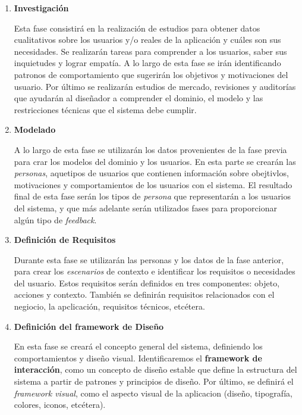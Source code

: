 \begin{enumerate}

\item \textbf{Investigación}

Esta fase consistirá en la realización de estudios para obtener datos cualitativos sobre los usuarios y/o reales de la aplicación y cuáles son sus necesidades. Se realizarán tareas para comprender a los usuarios, saber sus inquietudes y lograr empatía. A lo largo de esta fase se irán identificando patronos de comportamiento que sugerirán los objetivos y motivaciones del usuario. Por último se realizarán estudios de mercado, revisiones y auditorías que ayudarán al diseñador a comprender el dominio, el modelo y las restricciones técnicas que el sistema debe cumplir.

\item \textbf{Modelado}

A lo largo de esta fase se utilizarán los datos provenientes de la fase previa para crar los modelos del dominio y los usuarios. En esta parte se crearán las \textit{personas}, aquetipos de usuarios que contienen información sobre obejtivlos, motivaciones y comportamientos de los usuarios con el sistema. El resultado final de esta fase serán los tipos de \textit{persona} que representarán a los usuarios del sistema, y que más adelante serán utilizados fases para proporcionar algún tipo de \textit{feedback}.

\item \textbf{Definición de Requisitos}

Durante esta fase se utilizarán las personas y los datos de la fase anterior, para crear los \textit{escenarios} de contexto e identificar los requisitos o necesidades del usuario. Estos requisitos serán definidos en tres componentes: objeto, acciones y contexto. También se definirán requisitos relacionados con el negiocio, la apclicación, requisitos técnicos, etcétera.

\item \textbf{Definición del framework de Diseño}

En esta fase se creará el concepto general del sistema, definiendo los comportamientos y diseño visual. Identificaremos el \textbf{framework de interacción}, como un concepto de diseño estable que define la estructura del sistema a partir de patrones y principios de diseño. Por último, se definirá el \textit{framework visual}, como el aspecto visual de la aplicacion (diseño, tipografía, colores, iconos, etcétera).

\end{enumerate}

